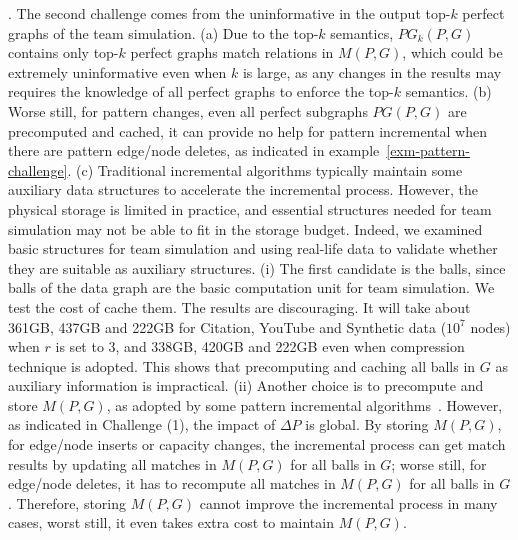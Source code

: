 {.
The second challenge comes from the uninformative in the output top-$k$ perfect graphs of the team simulation.
(a) Due to the top-$k$ semantics, $PG_k(P,G)$ contains only top-$k$ perfect graphs \wrt match relations in $M(P,G)$, which could be extremely uninformative even when $k$ is large, as any changes in the results may requires the knowledge of all perfect graphs to enforce the top-$k$ semantics.
(b) Worse still, for pattern changes, even all perfect subgraphs $PG(P,G)$ are precomputed and cached, it can provide no help for pattern incremental when there are pattern edge/node deletes, as indicated in example~\ref{exm-pattern-challenge}.
(c) Traditional incremental algorithms typically maintain some auxiliary data structures to accelerate the incremental process. However, the physical storage is limited in practice, and essential structures needed for team simulation may not be able to fit in the storage budget.
Indeed, we examined basic structures for team simulation and using real-life data to validate whether they are suitable as auxiliary structures.
%
(i) The first candidate is the balls, since balls of the data graph are the basic computation unit for team simulation. We test the cost of cache them. The results are discouraging.
It will take about 361GB, 437GB and 222GB for Citation, YouTube and Synthetic data ($10^7$ nodes) when $r$ is set to 3, and 338GB, 420GB and 222GB even when compression technique is adopted. This shows that precomputing and caching all balls in $G$ as auxiliary information is impractical.
(ii) Another choice is to precompute and store $M(P,G)$, as adopted by some pattern incremental algorithms~\cite{FanWW13-tods}.
However, as indicated in Challenge (1), the impact of $\Delta P$ is global. By storing $M(P,G)$, for edge/node inserts or capacity changes, the incremental process can get match results by updating all matches in $M(P,G)$ for all balls in $G$; worse still, for edge/node deletes, it has to recompute all matches in $M(P,G)$ for all balls in $G$. Therefore, storing $M(P,G)$ cannot improve the incremental process in many cases, worst still, it even takes extra cost to maintain $M(P,G)$.
}%


